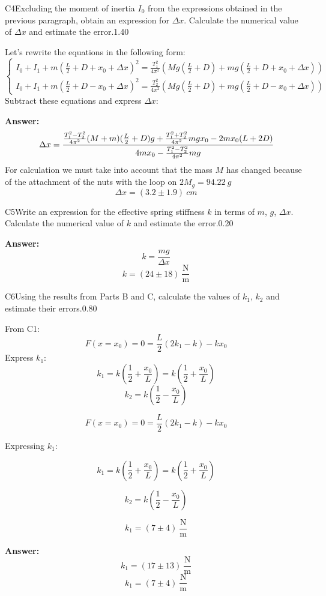 \documentclass[11pt,a4paper]{article}
\begin{document}
\begin{solcard}{C4}{Excluding the moment of inertia $I_0$ from the expressions obtained in the previous paragraph, obtain an expression for $\Delta x$. Calculate the numerical value of $\Delta x$ and estimate the error.}{1.40}

Let's rewrite the equations in the following form: $$\begin{cases} I_0+I_1+m\left(\frac{L}{2}+D+x_0+\Delta x\right)^2 = \frac{T_1^2}{4\pi^2} \left(Mg\left(\frac{L}{2}+D\right)+mg\left(\frac{L}{2}+D+ x_0+\Delta x\right)\right) \\ I_0+I_1+m\left(\frac{L}{2}+D-x_0+\Delta x\right)^2 = \frac{T_2^2}{4\pi^2} \left(Mg\left(\frac{L}{2}+D\right)+mg\left(\frac{L}{2}+D- x_0+\Delta x\right)\right) \end{cases}$$ Subtract these equations and express $\Delta x$:

\par\smallskip\noindent\textbf{Answer:} $$ \Delta x= \cfrac{\frac{T_1^2-T_2^2}{4\pi^2}(M+m)(\frac{L}{2}+D)g + \frac{T_1^2+T_2^2}{4\pi^2}mgx_0-2mx_0(L+2D)}{4mx_0 - \frac{T_1^2-T_2^2}{4\pi^2}mg} $$For calculation we must take into account that the mass $M$ has changed because of the attachment of the nuts with the loop on $2M_g = 94.22~ g$ $$\Delta x = (3.2 \pm 1.9)~cm$$
\end{solcard}

\begin{solcard}{C5}{Write an expression for the effective spring stiffness $k$ in terms of $m$, $g$, $\Delta x$. Calculate the numerical value of $k$ and estimate the error.}{0.20}
\par\smallskip\noindent\textbf{Answer:} $$k = \frac{mg}{\Delta x}$$$$k = (24\pm18)~\frac{\text{N}}{\text{m}}$$
\end{solcard}

\begin{solcard}{C6}{Using the results from Parts B and C, calculate the values of $k_1$, $k_2$ and estimate their errors.}{0.80}

From C1: $$F(x=x_0)= 0 = \frac{L}{2}(2k_1 - k) - kx_0$$ Express $k_1$: $$k_1 = k\left(\frac{1}{2}+\frac{x_0}{L}\right) = k\left(\frac{1}{2}+\frac{x_0}{L}\right) $$ $$k_2 = k\left(\dfrac{1}{2} - \dfrac{x_0}{L}\right)$$


$$F(x=x_0)= 0 = \frac{L}{2}(2k_1 - k) - kx_0$$


Expressing $k_1$:


$$k_1 = k\left(\frac{1}{2}+\frac{x_0}{L}\right) = k\left(\frac{1}{2}+\frac{x_0}{L}\right) $$


$$k_2 = k\left(\dfrac{1}{2} - \dfrac{x_0}{L}\right)$$


$$k_1 = (7 \pm 4)~\frac{\text{N}}{\text{m}}$$

\par\smallskip\noindent\textbf{Answer:} $$k_1 = (17 \pm 13)~\frac{\text{N}}{\text{m}}$$ $$k_1 = (7 \pm 4)~\frac{\text{N}}{\text{m}}$$
\end{solcard}
\end{document}
